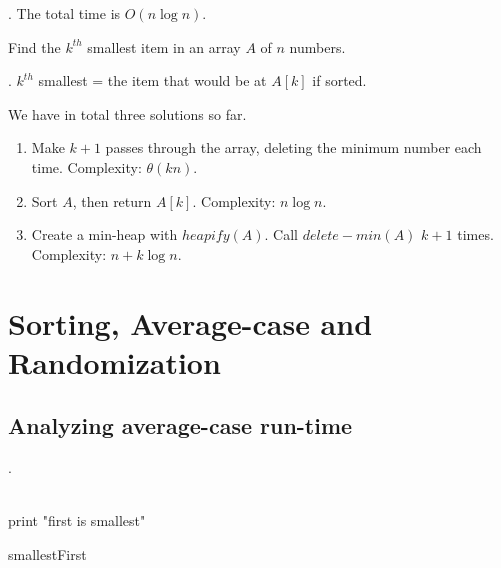 \documentclass{article}
\begin{document}
\begin{result}[ ].
    The total time is $O(n \log{n})$. 
\end{result}

\begin{Question}{Find the $k^{th}$ smallest item in an array $A$ of $n$ numbers.}
    \begin{comm}[].
        $k^{th}$ smallest = the item that would be at $A[k]$ if sorted.
    \end{comm}
\end{Question}

\begin{solution}
    We have in total three solutions so far. 
    \begin{enumerate}
        \item Make $k+1$ passes through the array, deleting the minimum number each time. 
        \null\hfill Complexity: $\theta(kn)$.

        \item Sort $A$, then return $A[k]$.
        \null\hfill Complexity: $n \log{n}$.
        
        \item Create a min-heap with $heapify(A)$. Call $delete-min(A)$ $k+1$ times.
        \null\hfill Complexity: $n + k \log{n}$.
    \end{enumerate}
\end{solution}

\newpage

\section{Sorting, Average-case and Randomization}

\begin{center}
\end{center}

\subsection{Analyzing average-case run-time}

\begin{examplee}.
    \begin{algorithm}[H] 
         { \\ 
             {
                print "first is smallest"
            }} 
        \caption{smallestFirst}
    \end{algorithm}
\end{examplee}
\end{document}
